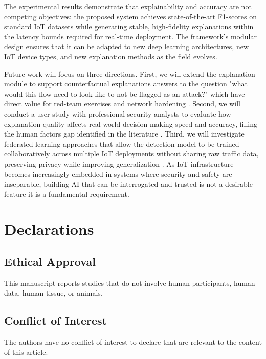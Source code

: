 \documentclass[a4paper,fleqn]{cas-dc}
\numberwithin{equation}{section}
\begin{document}
The experimental results demonstrate that explainability and accuracy are not competing objectives: the proposed system achieves state-of-the-art F1-scores on standard IoT datasets while generating stable, high-fidelity explanations within the latency bounds required for real-time deployment. The framework's modular design ensures that it can be adapted to new deep learning architectures, new IoT device types, and new explanation methods as the field evolves.

Future work will focus on three directions. First, we will extend the explanation module to support counterfactual explanations answers to the question "what would this flow need to look like to not be flagged as an attack?" which have direct value for red-team exercises and network hardening \cite{frontiers2025ids, das2023trustworthy}. Second, we will conduct a user study with professional security analysts to evaluate how explanation quality affects real-world decision-making speed and accuracy, filling the human factors gap identified in the literature \cite{zolanvari2021transparent, mdpi2025industry5}. Third, we will investigate federated learning approaches that allow the detection model to be trained collaboratively across multiple IoT deployments without sharing raw traffic data, preserving privacy while improving generalization \cite{nguyen2022explainable, ijcrt2025threat}. As IoT infrastructure becomes increasingly embedded in systems where security and safety are inseparable, building AI that can be interrogated and trusted is not a desirable feature it is a fundamental requirement.

\section*{Declarations}

\subsection*{Ethical Approval}
This manuscript reports studies that do not involve human participants, human data, human tissue, or animals.

\subsection*{Conflict of Interest}
The authors have no conflict of interest to declare that are relevant to the content of this article.
\end{document}
